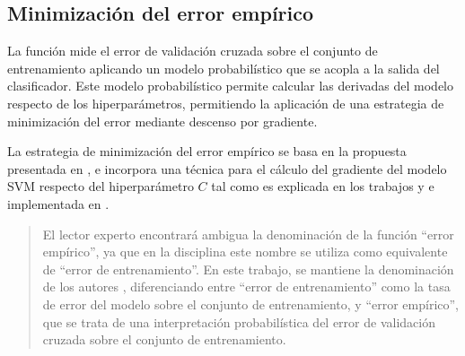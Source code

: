 %
%
\subsection{Minimización del error empírico}
%
La función  mide el error de validación cruzada
sobre el conjunto de entrenamiento aplicando un modelo probabilístico
que se acopla a la salida del clasificador.
Este modelo probabilístico permite calcular las derivadas del modelo
respecto de los hiperparámetros, permitiendo la aplicación de una
estrategia de minimización del error mediante descenso por gradiente.

La estrategia de minimización del error empírico se basa en la
propuesta presentada en \cite{ayat}, e incorpora una técnica para el
cálculo del gradiente del modelo SVM respecto del hiperparámetro $C$
tal como es explicada en los trabajos \cite{keerthi} y
\cite{glasmachers} e implementada en \cite{shark}.
%
\begin{quote}
  El lector experto encontrará ambigua la denominación de la función
  ``error empírico'', ya que en la disciplina este nombre se utiliza
  como equivalente de ``error de entrenamiento''.
  En este trabajo, se mantiene la denominación de los autores
  \cite{ayat}, diferenciando entre ``error de entrenamiento'' como la
  tasa de error del modelo sobre el conjunto de entrenamiento, y
  ``error empírico'', que se trata de una interpretación
  probabilística del error de validación cruzada sobre el conjunto de
  entrenamiento.
\end{quote}
%
